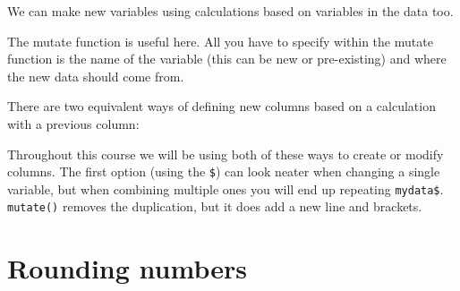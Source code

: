 \documentclass[]{book}
\makeatletter
\newenvironment{Shaded}{\begin{snugshade}}{\end{snugshade}}
\newcommand{\CommentTok}[1]{\textcolor[rgb]{0.56,0.35,0.01}{\textit{#1}}}
\newcommand{\DataTypeTok}[1]{\textcolor[rgb]{0.13,0.29,0.53}{#1}}
\newcommand{\DecValTok}[1]{\textcolor[rgb]{0.00,0.00,0.81}{#1}}
\newcommand{\KeywordTok}[1]{\textcolor[rgb]{0.13,0.29,0.53}{\textbf{#1}}}
\newcommand{\NormalTok}[1]{#1}
\newcommand{\OperatorTok}[1]{\textcolor[rgb]{0.81,0.36,0.00}{\textbf{#1}}}
\newcommand{\OtherTok}[1]{\textcolor[rgb]{0.56,0.35,0.01}{#1}}
\newcommand{\StringTok}[1]{\textcolor[rgb]{0.31,0.60,0.02}{#1}}
\newenvironment{kframe}{%
\medskip{}
\setlength{\fboxsep}{.8em}
 \def\at@end@of@kframe{}%
 \ifinner\ifhmode%
  \def\at@end@of@kframe{\end{minipage}}%
  \begin{minipage}{\columnwidth}%
 \fi\fi%
 \def\FrameCommand##1{\hskip\@totalleftmargin \hskip-\fboxsep
 \colorbox{shadecolor}{##1}\hskip-\fboxsep
     \hskip-\linewidth \hskip-\@totalleftmargin \hskip\columnwidth}%
 \MakeFramed {\advance\hsize-\width
   \@totalleftmargin\z@ \linewidth\hsize
   \@setminipage}}%
 {\par\unskip\endMakeFramed%
 \at@end@of@kframe}
\renewenvironment{Shaded}{\begin{kframe}}{\end{kframe}}
\theoremstyle{definition}
\theoremstyle{definition}
\theoremstyle{definition}
\theoremstyle{remark}
\makeatother
\begin{document}
\begin{Shaded}
\end{Shaded}

We can make new variables using calculations based on variables in the
data too.

The mutate function is useful here. All you have to specify within the
mutate function is the name of the variable (this can be new or
pre-existing) and where the new data should come from.

There are two equivalent ways of defining new columns based on a
calculation with a previous column:

\begin{Shaded}
\end{Shaded}

Throughout this course we will be using both of these ways to create or
modify columns. The first option (using the \texttt{\$}) can look neater
when changing a single variable, but when combining multiple ones you
will end up repeating \texttt{mydata\$}. \texttt{mutate()} removes the
duplication, but it does add a new line and brackets.

\hypertarget{rounding-numbers}{%
\section{Rounding numbers}\label{rounding-numbers}}
\end{document}
